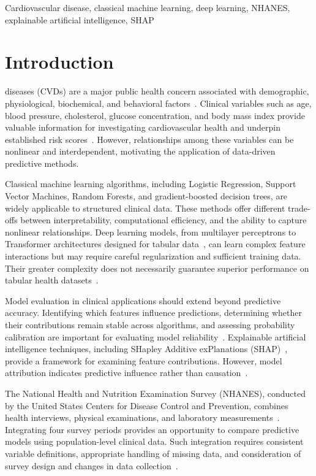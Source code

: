 \documentclass[journal]{IEEEtran}
\begin{document}
\begin{IEEEkeywords}
Cardiovascular disease, classical machine learning, deep learning, NHANES, explainable artificial intelligence, SHAP
\end{IEEEkeywords}

\section{Introduction}
 diseases (CVDs) are a major public health concern associated with demographic, physiological, biochemical, and behavioral factors~\cite{tsao2023,roth2020}. Clinical variables such as age, blood pressure, cholesterol, glucose concentration, and body mass index provide valuable information for investigating cardiovascular health and underpin established risk scores~\cite{dagostino2008,goff2014}. However, relationships among these variables can be nonlinear and interdependent, motivating the application of data-driven predictive methods.

Classical machine learning algorithms, including Logistic Regression, Support Vector Machines, Random Forests, and gradient-boosted decision trees, are widely applicable to structured clinical data. These methods offer different trade-offs between interpretability, computational efficiency, and the ability to capture nonlinear relationships. Deep learning models, from multilayer perceptrons to Transformer architectures designed for tabular data~\cite{gorishniy2021}, can learn complex feature interactions but may require careful regularization and sufficient training data. Their greater complexity does not necessarily guarantee superior performance on tabular health datasets~\cite{christodoulou2019,grinsztajn2022,shwartzziv2022}.

Model evaluation in clinical applications should extend beyond predictive accuracy. Identifying which features influence predictions, determining whether their contributions remain stable across algorithms, and assessing probability calibration are important for evaluating model reliability~\cite{vancalster2019}. Explainable artificial intelligence techniques, including SHapley Additive exPlanations (SHAP)~\cite{lundberg2017}, provide a framework for examining feature contributions. However, model attribution indicates predictive influence rather than causation~\cite{rudin2019}.

The National Health and Nutrition Examination Survey (NHANES), conducted by the United States Centers for Disease Control and Prevention, combines health interviews, physical examinations, and laboratory measurements~\cite{nhanes}. Integrating four survey periods provides an opportunity to compare predictive models using population-level clinical data. Such integration requires consistent variable definitions, appropriate handling of missing data, and consideration of survey design and changes in data collection~\cite{johnson2013}.
\end{document}
